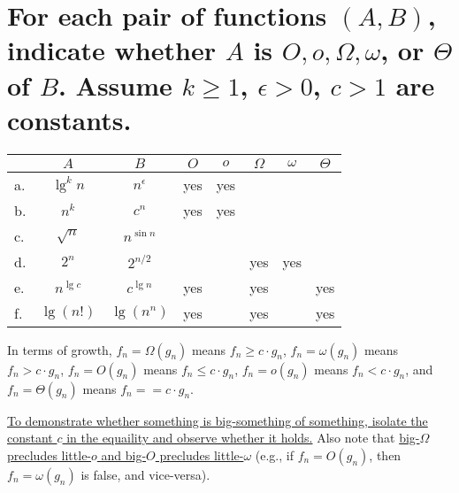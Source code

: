 \section[Problem 5]{For each pair of functions $(A, B)$, indicate whether $A$ is $O, o, \Omega, \omega$, or $\Theta$ of $B$. Assume $k \geq 1$, $\epsilon > 0$, $c > 1$ are constants.}
\begin{center}
	\begin{tabular}{lcc|c|c|c|c|c}
		& $A$ & $B$ & $O$ & $o$ & $\Omega$ & $\omega$ & $\Theta$ \\ \hline
		a. & $\lg^k n$ & $n^{\epsilon}$ & yes & yes &  &  &  \\ \hline
		b. & $n^k$ & $c^n$				& yes & yes &  &  &  \\ \hline
		c. & $\sqrt{n}$ & $n^{\sin n}$	&  &  &  &  &  \\ \hline
		d. & $2^n$ & $2^{n/2}$			&  &  & yes & yes &  \\ \hline
		e. & $n^{\lg c}$ & $c^{\lg n}$	& yes &  & yes &  & yes \\ \hline
		f. & $\lg(n!)$ & $\lg(n^n)$		& yes &  & yes &  & yes 
	\end{tabular}
\end{center}

\noindent
In terms of growth,
$f_n = \Omega(g_n)$ means	$f_n \geq c \cdot g_n$,
$f_n = \omega(g_n)$ means	$f_n > c \cdot g_n$,
$f_n = O(g_n)$ means		$f_n \leq c \cdot g_n$,
$f_n = o(g_n)$ means		$f_n < c \cdot g_n$, and
$f_n = \Theta(g_n)$ means	$f_n == c \cdot g_n$. 

\ul{To demonstrate whether something is big-something of something, isolate the constant $c$ in the equaility and observe whether it holds.} Also note that \ul{big-$\Omega$ precludes little-$o$ and big-$O$ precludes little-$\omega$} (e.g., if $f_n = O(g_n)$, then $f_n = \omega(g_n)$ is false, and vice-versa).
